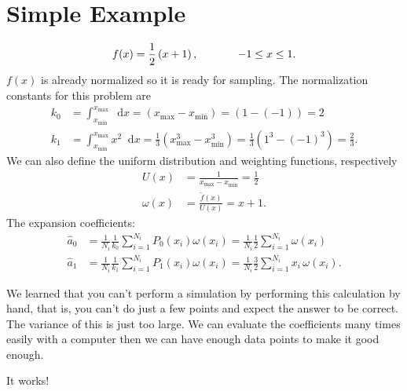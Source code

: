 \documentclass[12pt]{article}
\newcommand{\xmax}{x_{\max}}
\newcommand{\xmin}{x_{\min}}
\newcommand{\dd}{\mathop{}\!\mathrm{d}}
\begin{document}
\section{Simple Example}
\begin{equation}
    f(x) = \frac{1}{2}\left( x+1 \right), \hspace{0.5in} -1 \leq x \leq 1.
    \label{eq:original}
\end{equation}
$f(x)$ is already normalized so it is ready for sampling.  The normalization constants for this problem are
\begin{subequations}
    \begin{align}
        k_0 &= \int_{\xmin}^{\xmax}  \dd x = \left(\xmax - \xmin\right) = \left(1 - (-1)\right) = 2 \\
        k_1 &= \int_{\xmin}^{\xmax} x^2 \dd x = \frac{1}{3}\left(\xmax^3 - \xmin^3\right) = \frac{1}{3}\left(1^3 - (-1)^3\right) = \frac{2}{3}.
    \end{align}
\end{subequations}
We can also define the uniform distribution and weighting functions, respectively
\begin{subequations}
    \begin{align}
        U(x) &= \frac{1}{\xmax - \xmin} = \frac{1}{2} \\
        \omega(x) &= \frac{\tilde{f}(x)}{U(x)} = x+1.
    \end{align}
\end{subequations}
The expansion coefficients:
\begin{subequations}
    \begin{align}
        \hat{a}_0 &= \frac{1}{N_i}\frac{1}{k_0} \sum_{i=1}^{N_i} P_0(x_i)\omega(x_i) = \frac{1}{N_i}\frac{1}{2} \sum_{i=1}^{N_i} \omega(x_i) \\
        \hat{a}_1 &= \frac{1}{N_i}\frac{1}{k_1} \sum_{i=1}^{N_i} P_1(x_i)\omega(x_i) = \frac{1}{N_i}\frac{3}{2} \sum_{i=1}^{N_i} x_i\,\omega(x_i).
    \end{align}
    \label{eq:MCCoeffSimple}
\end{subequations}

We learned that you can't perform a simulation by performing this calculation by hand, that is, you can't do just a few points and expect the answer to be correct.  The variance of this is just too large.  We can evaluate the coefficients many times easily with a computer then we can have enough data points to make it good enough.  
    
It works!
\end{document}

